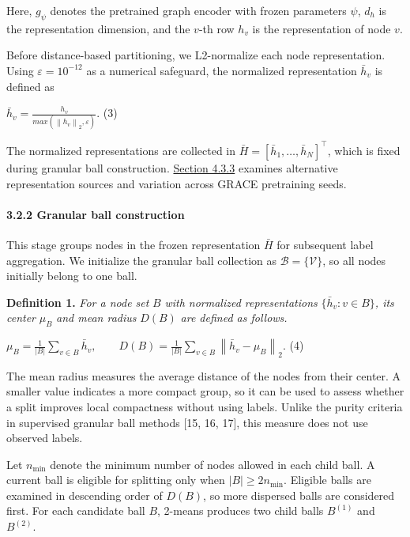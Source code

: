 Here, \(g_{\psi}\) denotes the pretrained graph encoder with frozen parameters \(\psi\), \(d_{h}\) is the representation dimension, and the \(v\)-th row \(h_{v}\) is the representation of node \(v\).

Before distance-based partitioning, we L2-normalize each node representation. Using \(\varepsilon = 10^{- 12}\) as a numerical safeguard, the normalized representation \({\bar{h}}_{v}\) is defined as

\({\bar{h}}_{v} = \frac{h_{v}}{max(\left\| h_{v} \right\|_{2},\varepsilon)}.\) (3)

The normalized representations are collected in \(\bar{H} = \left\lbrack {\bar{h}}_{1},\ldots,{\bar{h}}_{N} \right\rbrack^{\top}\), which is fixed during granular ball construction. \hyperref[effect-of-the-representation-space]{Section 4.3.3} examines alternative representation sources and variation across GRACE pretraining seeds.

\paragraph{3.2.2 Granular ball construction}\label{granular-ball-construction}

This stage groups nodes in the frozen representation \(\bar{H}\) for subsequent label aggregation. We initialize the granular ball collection as \(\mathcal{B} = \{\mathcal{V}\}\), so all nodes initially belong to one ball.

\textbf{Definition 1.} \emph{For a node set} \(B\) \emph{with normalized representations} \(\{{\bar{h}}_{v}:v \in B\}\)\emph{, its center} \(\mu_{B}\) \emph{and mean radius} \(D(B)\) \emph{are defined as follows.}

\(\mu_{B} = \frac{1}{|B|}\sum_{v \in B}^{}{\bar{h}}_{v},\quad\quad D(B) = \frac{1}{|B|}\sum_{v \in B}^{}\left\| {\bar{h}}_{v} - \mu_{B} \right\|_{2}.\) (4)

The mean radius measures the average distance of the nodes from their center. A smaller value indicates a more compact group, so it can be used to assess whether a split improves local compactness without using labels. Unlike the purity criteria in supervised granular ball methods {[}15, 16, 17{]}, this measure does not use observed labels.

Let \(n_{\min}\) denote the minimum number of nodes allowed in each child ball. A current ball is eligible for splitting only when \(|B| \geq 2n_{\min}\). Eligible balls are examined in descending order of \(D(B)\), so more dispersed balls are considered first. For each candidate ball \(B\), 2-means produces two child balls \(B^{(1)}\) and \(B^{(2)}\).

